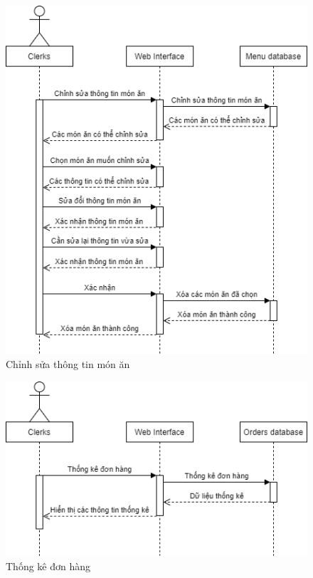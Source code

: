 \newpage
\begin{figure}[!h]
    \begin{center}
        \includegraphics[scale=0.6]{Images/SequenceDiagram/SD_edit.png}
    \end{center}
    \hspace{0.3cm}
    \caption{Chỉnh sửa thông tin món ăn}
\end{figure}
\begin{figure}[!h]
    \begin{center}
        \includegraphics[scale=0.5]{Images/SequenceDiagram/SD_statistic.png}
    \end{center}
    \hspace{0.3cm}
    \caption{Thống kê đơn hàng}
\end{figure}
